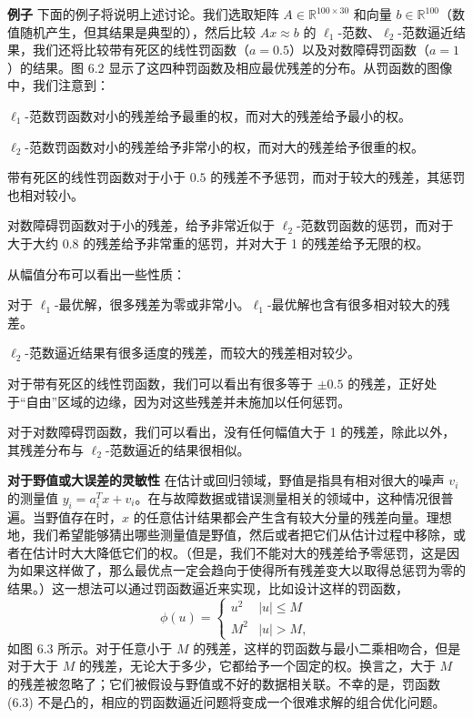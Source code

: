 \documentclass[UTF8, 12pt, fontset=fandol, oneside]{ctexart}
\begin{document}
\noindent\textbf{例子}\quad
下面的例子将说明上述讨论。我们选取矩阵 $A\in\mathbb{R}^{100\times 30}$ 和向量 $b\in\mathbb{R}^{100}$（数值随机产生，但其结果是典型的），然后比较 $Ax\approx b$ 的 $\ell_1$-范数、$\ell_2$-范数逼近结果，我们还将比较带有死区的线性罚函数（$a=0.5$）以及对数障碍罚函数（$a=1$）的结果。图 6.2 显示了这四种罚函数及相应最优残差的分布。从罚函数的图像中，我们注意到：

$\ell_1$-范数罚函数对小的残差给予最重的权，而对大的残差给予最小的权。

$\ell_2$-范数罚函数对小的残差给予非常小的权，而对大的残差给予很重的权。

带有死区的线性罚函数对于小于 $0.5$ 的残差不予惩罚，而对于较大的残差，其惩罚也相对较小。

对数障碍罚函数对于小的残差，给予非常近似于 $\ell_2$-范数罚函数的惩罚，而对于大于大约 $0.8$ 的残差给予非常重的惩罚，并对大于 1 的残差给予无限的权。

从幅值分布可以看出一些性质：

对于 $\ell_1$-最优解，很多残差为零或非常小。$\ell_1$-最优解也含有很多相对较大的残差。

$\ell_2$-范数逼近结果有很多适度的残差，而较大的残差相对较少。

对于带有死区的线性罚函数，我们可以看出有很多等于 $\pm 0.5$ 的残差，正好处于``自由''区域的边缘，因为对这些残差并未施加以任何惩罚。

对于对数障碍罚函数，我们可以看出，没有任何幅值大于 1 的残差，除此以外，其残差分布与 $\ell_2$-范数逼近的结果很相似。

\noindent\textbf{对于野值或大误差的灵敏性}\quad
在估计或回归领域，野值是指具有相对很大的噪声 $v_i$ 的测量值 $y_i=a_i^Tx+v_i$。在与故障数据或错误测量相关的领域中，这种情况很普遍。当野值存在时，$x$ 的任意估计结果都会产生含有较大分量的残差向量。理想地，我们希望能够猜出哪些测量值是野值，然后或者把它们从估计过程中移除，或者在估计时大大降低它们的权。（但是，我们不能对大的残差给予零惩罚，这是因为如果这样做了，那么最优点一定会趋向于使得所有残差变大以取得总惩罚为零的结果。）这一想法可以通过罚函数逼近来实现，比如设计这样的罚函数，
\begin{equation}
\phi(u)=
\begin{cases}
u^2 & |u|\leq M\\
M^2 & |u|>M,
\end{cases}
\tag{6.3}
\end{equation}
如图 6.3 所示。对于任意小于 $M$ 的残差，这样的罚函数与最小二乘相吻合，但是对于大于 $M$ 的残差，无论大于多少，它都给予一个固定的权。换言之，大于 $M$ 的残差被忽略了；它们被假设与野值或不好的数据相关联。不幸的是，罚函数 (6.3) 不是凸的，相应的罚函数逼近问题将变成一个很难求解的组合优化问题。
\end{document}
